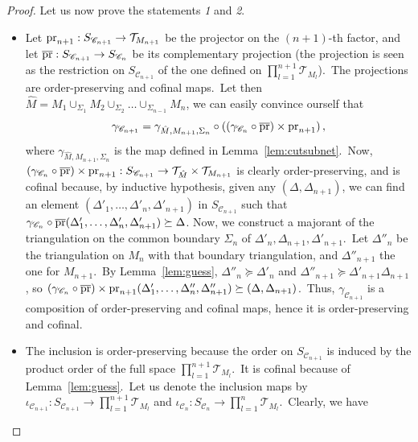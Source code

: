 \documentclass[11pt]{article}
\theoremstyle{definition}
\numberwithin{equation}{section}
\begin{document}
\begin{proof}
\noindent
Let us now prove the statements \emph{1} and \emph{2}.
\begin{itemize}
    \item[\emph{1.}] Let ${\rm pr}_{n+1}:S_{\mathscr{C}_{n+1}}\to \mathcal{T}_{M_{n+1}}$ be the projector on the $(n+1)$-th factor, and let $\overline{\rm pr}:S_{\mathscr{C}_{n+1}}\to S_{\mathscr{C}_n}$ be its complementary projection (the projection is seen as the restriction on $S_{\mathscr{C}_{n+1}}$ of the one defined on $\prod_{l=1}^{n+1}\mathcal{T}_{M_l}$).~The projections are order-preserving and cofinal maps.~Let then $\hat{M}=M_1\cup_{\Sigma_1}M_2\cup_{\Sigma_2}\dots\cup_{\Sigma_{n-1}}M_{n}$, we can easily convince ourself that
    \begin{equation}
        \gamma_{\mathscr{C}_{n+1}}=\gamma_{\hat{M},M_{n+1},\Sigma_n}\circ((\gamma_{\mathscr{C}_{n}}\circ \overline{\rm pr})\times \mathrm{pr}_{n+1})\,,
    \end{equation}
    where $\gamma_{\hat{M},M_{n+1},\Sigma_n}$ is the map defined in Lemma~\ref{lem:cutsubnet}.~Now, $(\gamma_{\mathscr{C}_{n}}\circ \overline{\rm pr})\times \mathrm{pr}_{n+1}:S_{\mathscr{C}_{n+1}}\to \mathcal{T}_{\hat M}\times \mathcal{T}_{M_{n+1}}$ is clearly order-preserving, and is cofinal because, by inductive hypothesis, given any $(\Delta,\Delta_{n+1})$, we can find an element $(\Delta'_1,\dots,\Delta'_n,\Delta'_{n+1})$ in $S_{\mathscr{C}_{n+1}}$ such that $\gamma_{\mathscr{C}_{n}}\circ \overline{\rm pr}(\Delta'_1,\dots,\Delta'_n,\Delta'_{n+1})\succeq \Delta$. Now, we construct a majorant of the triangulation on the common boundary $\Sigma_n$ of $\Delta'_{n},\Delta_{n+1},\Delta'_{n+1}$.~Let $\Delta''_{n}$ be the triangulation on $M_n$ with that boundary triangulation, and $\Delta''_{n+1}$ the one for $M_{n+1}$.~By Lemma~\ref{lem:guess}, $\Delta''_{n}\succeq\Delta'_{n}$ and $\Delta''_{n+1}\succeq\Delta'_{n+1}\Delta_{n+1}$, so $(\gamma_{\mathscr{C}_{n}}\circ \overline{\rm pr})\times \mathrm{pr}_{n+1}(\Delta'_1,\dots,\Delta''_n,\Delta''_{n+1})\succeq(\Delta,\Delta_{n+1})$.~Thus, $\gamma_{\mathscr{C}_{n+1}}$ is a composition of order-preserving and cofinal maps, hence it is order-preserving and cofinal.
    \item[\emph{2.}] The inclusion is order-preserving because the order on $S_{\mathscr{C}_{n+1}}$ is induced by the product order of the full space $\prod_{l=1}^{n+1}\mathcal{T}_{M_l}$.~It is cofinal because of Lemma~\ref{lem:guess}.~Let us denote the inclusion maps by $\iota_{\mathscr{C}_{n+1}}:S_{\mathscr{C}_{n+1}}\to\prod_{l=1}^{n+1}\mathcal{T}_{M_l}$ and $\iota_{\mathscr{C}_{n}}:S_{\mathscr{C}_{n}}\to\prod_{l=1}^{n}\mathcal{T}_{M_l}$.~Clearly, we have

\end{itemize}
\end{proof}
\end{document}
